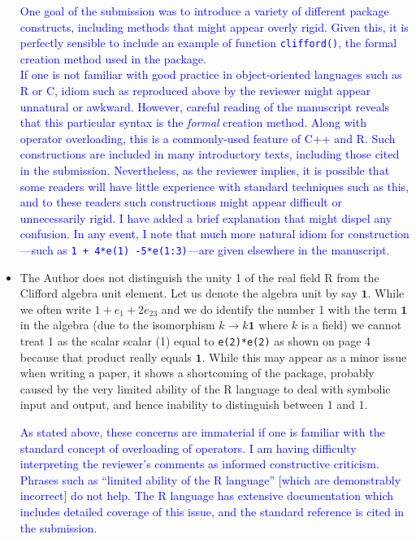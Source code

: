 \documentclass{article}
\begin{document}
\begin{itemize}
\textcolor{blue}{One goal of the submission was to introduce a variety
  of different package constructs, including methods that might appear
  overly rigid.  Given this, it is perfectly sensible to include an
  example of function {\tt clifford()}, the formal creation method
  used in the package.\\[10pt] If one is not familiar with good
  practice in object-oriented languages such as R or C, idiom such as
  reproduced above by the reviewer might appear unnatural or awkward.
  However, careful reading of the manuscript reveals that this
  particular syntax is the {\em formal} creation method.  Along with
  operator overloading, this is a commonly-used feature of C++ and R.
  Such constructions are included in many introductory texts,
  including those cited in the submission.  Nevertheless, as the
  reviewer implies, it is possible that some readers will have little
  experience with standard techniques such as this, and to these
  readers such constructions might appear difficult or unnecessarily
  rigid.  I have added a brief explanation that might dispel any
  confusion.  In any event, I note that much more natural idiom for
  construction---such as {\tt 1 + 4*e(1) -5*e(1:3)}---are given
  elsewhere in the manuscript.  }

\item The Author does not distinguish the unity 1 of the real field R
  from the Clifford algebra unit element. Let us denote the algebra
  unit by say $\mathbf{1}$. While we often write $1 + e_1 + 2e_{23}$
  and we do identify the number 1 with the term $\mathbf{1}$ in the
  algebra (due to the isomorphism $k\longrightarrow k\mathbf{1}$ where
  $k$ is a field) we cannot treat 1 as the scalar scalar (1) equal to
  \verb+e(2)*e(2)+ as shown on page 4 because that product really
  equals $\mathbf{1}$.  While this may appear as a minor issue when
  writing a paper, it shows a shortcoming of the package, probably
  caused by the very limited ability of the R language to deal with
  symbolic input and output, and hence inability to distinguish
  between 1 and 1.

  \textcolor{blue}{As stated above, these concerns are immaterial if
    one is familiar with the standard concept of overloading of
    operators.  I am having difficulty interpreting the reviewer's
    comments as informed constructive criticism.  Phrases such as
    ``limited ability of the R language'' [which are demonstrably
      incorrect] do not help.  The R language has extensive
    documentation which includes detailed coverage of this issue, and
    the standard reference is cited in the submission.}


\end{itemize}
\end{document}
